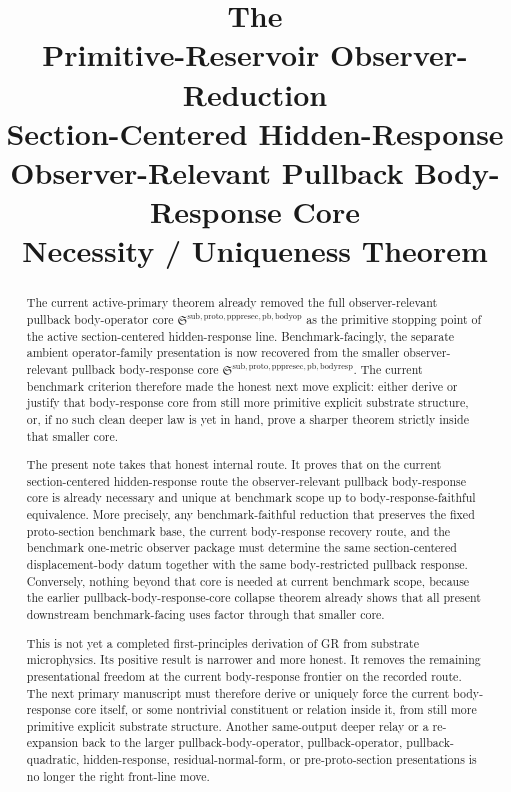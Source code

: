 \documentclass[11pt]{article}
\title{\textbf{The \TheoryName{}}\\[0.4em]
\large Primitive-Reservoir Observer-Reduction\\
\large Section-Centered Hidden-Response\\
\large Observer-Relevant Pullback Body-Response Core\\
\large Necessity / Uniqueness Theorem}
\author{}
\date{}
\newcommand{\PullbackBodyOperatorCore}{\mathfrak S^{\mathrm{sub,proto,pppresec,pb,bodyop}}}
\newcommand{\PullbackBodyResponseCore}{\mathfrak S^{\mathrm{sub,proto,pppresec,pb,bodyresp}}}
\begin{document}
\maketitle

\begin{abstract}
The current active-primary theorem already removed the full observer-relevant pullback body-operator core \(\PullbackBodyOperatorCore\) as the primitive stopping point of the active section-centered hidden-response line. Benchmark-facingly, the separate ambient operator-family presentation is now recovered from the smaller observer-relevant pullback body-response core \(\PullbackBodyResponseCore\). The current benchmark criterion therefore made the honest next move explicit: either derive or justify that body-response core from still more primitive explicit substrate structure, or, if no such clean deeper law is yet in hand, prove a sharper theorem strictly inside that smaller core.

The present note takes that honest internal route. It proves that on the current section-centered hidden-response route the observer-relevant pullback body-response core is already necessary and unique at benchmark scope up to body-response-faithful equivalence. More precisely, any benchmark-faithful reduction that preserves the fixed proto-section benchmark base, the current body-response recovery route, and the benchmark one-metric observer package must determine the same section-centered displacement-body datum together with the same body-restricted pullback response. Conversely, nothing beyond that core is needed at current benchmark scope, because the earlier pullback-body-response-core collapse theorem already shows that all present downstream benchmark-facing uses factor through that smaller core.

This is not yet a completed first-principles derivation of GR from substrate microphysics. Its positive result is narrower and more honest. It removes the remaining presentational freedom at the current body-response frontier on the recorded route. The next primary manuscript must therefore derive or uniquely force the current body-response core itself, or some nontrivial constituent or relation inside it, from still more primitive explicit substrate structure. Another same-output deeper relay or a re-expansion back to the larger pullback-body-operator, pullback-operator, pullback-quadratic, hidden-response, residual-normal-form, or pre-proto-section presentations is no longer the right front-line move.
\end{abstract}
\end{document}
